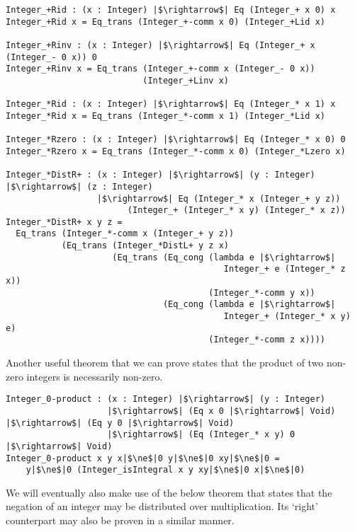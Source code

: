 \documentclass[12pt,twoside,maitrise]{dms}
\theoremstyle{definition}
\numberwithin{equation}{section}
\numberwithin{table}{chapter}
\numberwithin{figure}{chapter}
\begin{document}
\begin{verbatim}
Integer_+Rid : (x : Integer) |$\rightarrow$| Eq (Integer_+ x 0) x
Integer_+Rid x = Eq_trans (Integer_+-comm x 0) (Integer_+Lid x)

Integer_+Rinv : (x : Integer) |$\rightarrow$| Eq (Integer_+ x (Integer_- 0 x)) 0
Integer_+Rinv x = Eq_trans (Integer_+-comm x (Integer_- 0 x))
                           (Integer_+Linv x)

Integer_*Rid : (x : Integer) |$\rightarrow$| Eq (Integer_* x 1) x
Integer_*Rid x = Eq_trans (Integer_*-comm x 1) (Integer_*Lid x)

Integer_*Rzero : (x : Integer) |$\rightarrow$| Eq (Integer_* x 0) 0
Integer_*Rzero x = Eq_trans (Integer_*-comm x 0) (Integer_*Lzero x)

Integer_*DistR+ : (x : Integer) |$\rightarrow$| (y : Integer) |$\rightarrow$| (z : Integer)
                  |$\rightarrow$| Eq (Integer_* x (Integer_+ y z))
                        (Integer_+ (Integer_* x y) (Integer_* x z))
Integer_*DistR+ x y z =
  Eq_trans (Integer_*-comm x (Integer_+ y z))
           (Eq_trans (Integer_*DistL+ y z x)
                     (Eq_trans (Eq_cong (lambda e |$\rightarrow$|
                                           Integer_+ e (Integer_* z x))
                                        (Integer_*-comm y x))
                               (Eq_cong (lambda e |$\rightarrow$|
                                           Integer_+ (Integer_* x y) e)
                                        (Integer_*-comm z x))))
\end{verbatim}

Another useful theorem that we can prove states that the product of two non-zero integers is necessarily non-zero.

\begin{verbatim}
Integer_0-product : (x : Integer) |$\rightarrow$| (y : Integer)
                    |$\rightarrow$| (Eq x 0 |$\rightarrow$| Void) |$\rightarrow$| (Eq y 0 |$\rightarrow$| Void)
                    |$\rightarrow$| (Eq (Integer_* x y) 0 |$\rightarrow$| Void)
Integer_0-product x y x|$\ne$|0 y|$\ne$|0 xy|$\ne$|0 =
    y|$\ne$|0 (Integer_isIntegral x y xy|$\ne$|0 x|$\ne$|0)
\end{verbatim}

We will eventually also make use of the below theorem that states that the negation of an integer may be distributed over multiplication. Its `right' counterpart may also be proven in a similar manner.
\end{document}
